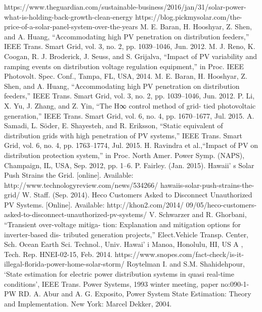 \begin{thebibliography}{00}
   https://www.theguardian.com/sustainable-business/2016/jan/31/solar-power-what-is-holding-back-growth-clean-energy
   https://blog.pickmysolar.com/the-price-of-a-solar-panel-system-over-the-years
   M. E. Baran, H. Hooshyar, Z. Shen, and A. Huang, “Accommodating high PV penetration on distribution feeders,” IEEE Trans. Smart Grid, vol. 3, no. 2, pp. 1039–1046, Jun. 2012.
    M. J. Reno, K. Coogan, R. J. Broderick, J. Seuss, and S. Grijalva, “Impact of PV variability and ramping events on distribution voltage regulation equipment,” in Proc. IEEE Photovolt. Spec. Conf., Tampa, FL, USA, 2014.
   M. E. Baran, H. Hooshyar, Z. Shen, and A. Huang, “Accommodating high PV penetration on distribution feeders,” IEEE Trans. Smart Grid, vol. 3, no. 2, pp. 1039–1046, Jun. 2012.
   P. Li, X. Yu, J. Zhang, and Z. Yin, “The H∞ control method of grid- tied photovoltaic generation,” IEEE Trans. Smart Grid, vol. 6, no. 4, pp. 1670–1677, Jul. 2015.
    A. Samadi, L. Söder, E. Shayesteh, and R. Eriksson, “Static equivalent of distribution grids with high penetration of PV systems,” IEEE Trans. Smart Grid, vol. 6, no. 4, pp. 1763–1774, Jul. 2015.
    H. Ravindra et al.,“Impact of PV on distribution protection system,” in Proc. North Amer. Power Symp. (NAPS), Champaign, IL, USA, Sep. 2012, pp. 1–6.
   P. Fairley. (Jan. 2015). Hawaii’ s Solar Push Strains the Grid. [online]. Available: http://www.technologyreview.com/news/534266/ hawaiis-solar-push-strains-the-grid/
   W. Staff. (Sep. 2014). Heco Customers Asked to Disconnect Unauthorized PV Systems. [Online]. Available: http://khon2.com/2014/ 09/05/heco-customers-asked-to-disconnect-unauthorized-pv-systems/
   V. Schwarzer and R. Ghorbani, “Transient over-voltage mitiga- tion: Explanation and mitigation options for inverter-based dis- tributed generation projects,” Elect.Vehicle Transp. Center, Sch. Ocean Earth Sci. Technol., Univ. Hawai’ i Manoa, Honolulu, HI, US A , Tech. Rep. HNEI-02-15, Feb. 2014.
   https://www.snopes.com/fact-check/is-it-illegal-florida-power-home-solar-storm/
   Roytelman I. and S.M. Shahidehpour, ‘State estimation for electric power distribution systems in quasi real-time conditions’, IEEE Trans. Power Systems, 1993 winter meeting, paper no:090-1-PW RD.
   A. Abur and A. G. Exposito, Power System State Estimation: Theory and Implementation. New York: Marcel Dekker, 2004.

\end{thebibliography}

